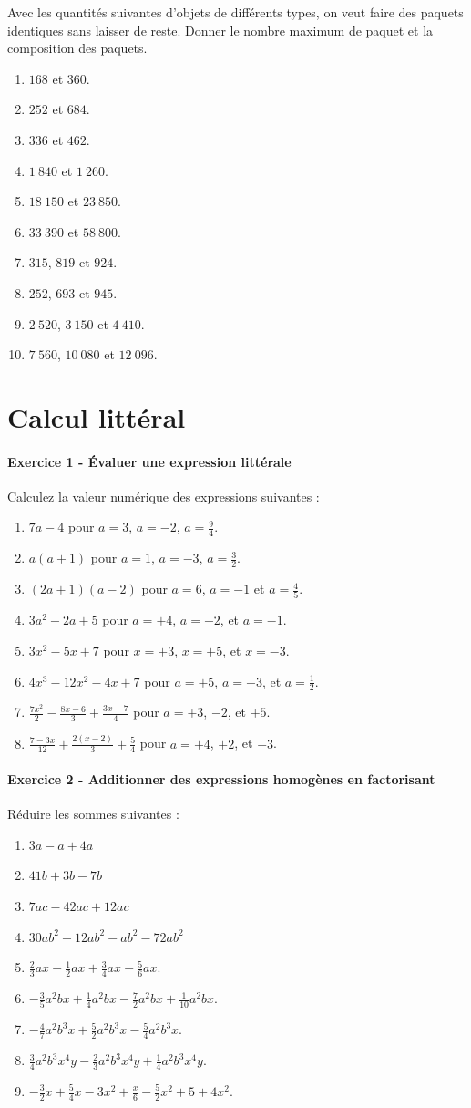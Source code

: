 \documentclass[14 pt]{extarticle}
\renewcommand\it\item
\theoremstyle{plain}
\begin{document}
  Avec les quantités suivantes d'objets de différents types, on veut faire des paquets identiques sans laisser de reste. Donner le nombre maximum de paquet et la composition des paquets. 
  \begin{enumerate}
  
 \item $168$ et $360$. 
 \item $252$ et $684$. 
 \item $336$ et $462$. 
 \item $1~840$ et $1~260$. 
 \item $18~150$ et $23~850$. 
 \item $33~390$ et $58~800$. 
 \item $315$, $819$ et $924$. 
 \item $252$, $693$ et $945$. 
 \item $2~520$, $3~150$ et $4~410$. 
 \item $7~560$, $10~080$ et $12~096$. 
  \end{enumerate}
  
\newpage
  \part{Calcul littéral}
  
    
  \subsection*{Exercice 1 - Évaluer une expression littérale}
  Calculez la valeur numérique des expressions suivantes : 
\begin{enumerate}
\item $7a - 4$ pour $a=3$, $a= -2$, $a=\frac94$.
\it $a(a+1)$ pour $a=1$, $a=-3$, $a=\frac32$.
\it $(2a+1)(a-2)$ pour $a=6$, $a=-1$ et $a=\frac45$.
\it $3a^2-2a+5$ pour $a =  +4$, $a=-2$, et $a=-1$.
\it $3x^2-5x+7$ pour $x =  +3$, $x=+5$, et $x=-3$.
\it $4x^3-12x^2-4x+7$ pour $a =  +5$, $a=-3$, et $a=\frac12$.
\it $\frac{7x^2}2- \frac{8x-6}3 + \frac{3x+7}4$ pour $a =  +3$, $-2$, et $+5$.
\it $\frac{7-3x}{12}+\frac{2(x-2)}3 +\frac54$ pour $a =  +4$, $+2$, et $-3$.
\end{enumerate}
  \subsection*{Exercice 2 - Additionner des expressions homogènes en factorisant}
  
Réduire les sommes suivantes : 
\begin{enumerate}
\it $3a-a + 4a$
\it $41b+ 3b - 7b$
\it $7ac - 42ac + 12 ac$
\it $30 ab^2 - 12 ab^2 - ab^2 - 72ab^2$
\it $\frac23ax-\frac12ax+\frac34ax-\frac56ax$.
\it $-\frac35a^2bx+\frac14a^2bx-\frac72a^2bx+\frac1{10}a^2bx$.
\it $-\frac47a^2b^3x+\frac52a^2b^3x-\frac54a^2b^3x$.
\it $\frac34a^2b^3x^4y-\frac23a^2b^3x^4y+\frac14a^2b^3x^4y$. 
\it $-\frac32 x + \frac54 x-3x^2+\frac{x}6-\frac52 x^2+5+4x^2$.

\end{enumerate}
\end{document}

